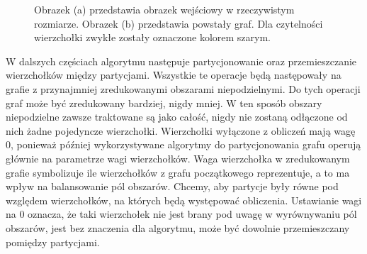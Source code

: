 \begin{figure}[h]
\centering
\begin{subfigure}{.5\textwidth}
    \centering
    \caption[short]{}
\end{subfigure}%
\begin{subfigure}{.5\textwidth}
    \centering
    \caption[short]{}
\end{subfigure}
\caption{Obrazek (a) przedstawia obrazek wejściowy w rzeczywistym rozmiarze. Obrazek (b) przedstawia powstały graf.
Dla czytelności wierzchołki zwykłe zostały oznaczone kolorem szarym. }
\label{im:input2}
\end{figure}

W dalszych częściach algorytmu następuje partycjonowanie oraz przemieszczanie wierzchołków między partycjami.
Wszystkie te operacje będą następowały na grafie z przynajmniej zredukowanymi obszarami niepodzielnymi.
Do tych operacji graf może być zredukowany bardziej, nigdy mniej.
W ten sposób obszary niepodzielne zawsze traktowane są jako całość, nigdy nie zostaną odłączone od nich żadne pojedyncze
wierzchołki.
Wierzchołki wyłączone z obliczeń mają wagę $0$, ponieważ później wykorzystywane algorytmy do partycjonowania grafu operują
głównie na parametrze wagi wierzchołków.
Waga wierzchołka w zredukowanym grafie symbolizuje ile wierzchołków z grafu początkowego reprezentuje, a to ma wpływ
na balansowanie pól obszarów.
Chcemy, aby partycje były równe pod względem wierzchołków, na których będą występować obliczenia.
Ustawianie wagi na $0$ oznacza, że taki wierzchołek nie jest brany pod uwagę w wyrównywaniu pól obszarów, jest
bez znaczenia dla algorytmu, może być dowolnie przemieszczany pomiędzy partycjami.
